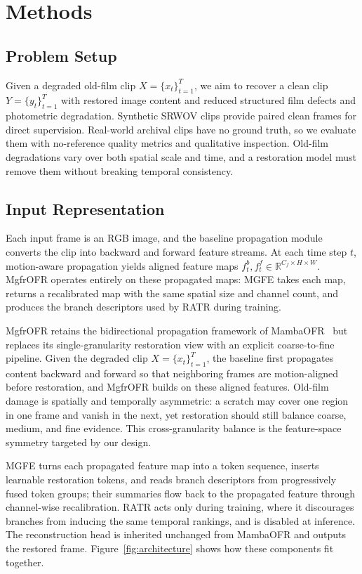 \section{Methods}
\label{sec:method}

\subsection{Problem Setup}
\label{subsec:problem_setup}

Given a degraded old-film clip $X=\{x_t\}_{t=1}^{T}$, we aim to recover a clean clip $Y=\{y_t\}_{t=1}^{T}$ with restored image content and reduced structured film defects and photometric degradation. Synthetic SRWOV clips provide paired clean frames for direct supervision. Real-world archival clips have no ground truth, so we evaluate them with no-reference quality metrics and qualitative inspection. Old-film degradations vary over both spatial scale and time, and a restoration model must remove them without breaking temporal consistency.

\subsection{Input Representation}
\label{subsec:input_representation}

Each input frame is an RGB image, and the baseline propagation module converts the clip into backward and forward feature streams. At each time step $t$, motion-aware propagation yields aligned feature maps $f_t^{b}, f_t^{f} \in \mathbb{R}^{C_f \times H \times W}$. MgfrOFR operates entirely on these propagated maps: MGFE takes each map, returns a recalibrated map with the same spatial size and channel count, and produces the branch descriptors used by RATR during training.

MgfrOFR retains the bidirectional propagation framework of MambaOFR~\cite{mao2025mambaofr} but replaces its single-granularity restoration view with an explicit coarse-to-fine pipeline. Given the degraded clip $X=\{x_t\}_{t=1}^{T}$, the baseline first propagates content backward and forward so that neighboring frames are motion-aligned before restoration, and MgfrOFR builds on these aligned features. Old-film damage is spatially and temporally asymmetric: a scratch may cover one region in one frame and vanish in the next, yet restoration should still balance coarse, medium, and fine evidence. This cross-granularity balance is the feature-space symmetry targeted by our design.

MGFE turns each propagated feature map into a token sequence, inserts learnable restoration tokens, and reads branch descriptors from progressively fused token groups; their summaries flow back to the propagated feature through channel-wise recalibration. RATR acts only during training, where it discourages branches from inducing the same temporal rankings, and is disabled at inference. The reconstruction head is inherited unchanged from MambaOFR and outputs the restored frame. Figure~\ref{fig:architecture} shows how these components fit together.

